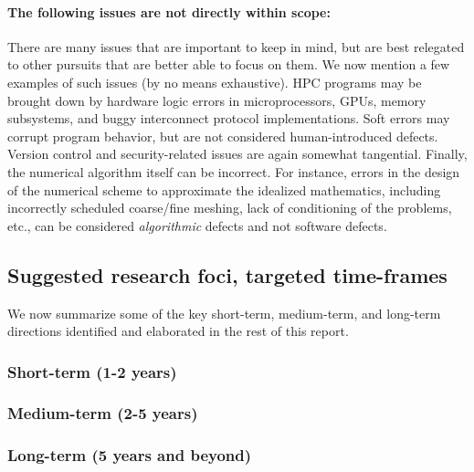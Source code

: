 \paragraph{The following issues are not directly within scope:} There are many issues that are important to keep in mind, but are best relegated to other pursuits that are better able to focus on them. 
%
We now mention a few examples of such issues (by no means exhaustive).
%
HPC programs may be brought down by
hardware logic errors in microprocessors, GPUs,
memory subsystems, and  buggy interconnect
protocol implementations.
%    
Soft errors may corrupt program behavior, but are not considered human-introduced 
defects.
%
Version control and security-related issues are again somewhat tangential.
%
Finally, the numerical algorithm itself can be incorrect.
%
For instance,
errors in the design of the numerical scheme to
approximate the idealized mathematics,
including incorrectly scheduled coarse/fine meshing, lack of
conditioning of the problems, etc.,
can be considered {\em algorithmic}
defects and not software defects.
%

  
\subsection{Suggested research foci, targeted time-frames}
% 
% 

 
 We now summarize some of the key short-term, medium-term, and long-term directions identified and elaborated in the rest of this report.
 
 
      \subsubsection{Short-term (1-2 years)}
      

      \subsubsection{Medium-term (2-5 years)}
      

      \subsubsection{Long-term (5 years and beyond)}
      

  
